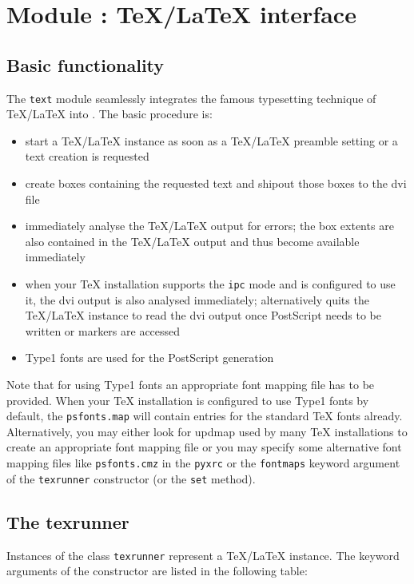 \chapter[Module \module{text}: TeX/LaTeX interface]{Module : \TeX/\LaTeX{} interface}
\label{module:text}

\section{Basic functionality}

The \verb|text| module seamlessly integrates the famous typesetting
technique of \TeX/\LaTeX{} into \PyX. The basic procedure is:
\begin{itemize}
\item start a \TeX/\LaTeX{} instance as soon as a \TeX/\LaTeX{}
preamble setting or a text creation is requested
\item create boxes containing the requested text and shipout those
boxes to the dvi file
\item immediately analyse the \TeX/\LaTeX{} output for errors; the box
extents are also contained in the \TeX/\LaTeX{} output and thus become
available immediately
\item when your TeX installation supports the \verb|ipc| mode and
\PyX{} is configured to use it, the dvi output is also analysed
immediately; alternatively \PyX{} quits the \TeX/\LaTeX{} instance to
read the dvi output once PostScript needs to be written or markers are
accessed
\item Type1 fonts are used for the PostScript generation
\end{itemize}

Note that for using Type1 fonts an appropriate font mapping file has
to be provided. When your \TeX{} installation is configured to use
Type1 fonts by default, the \verb|psfonts.map| will contain entries
for the standard \TeX{} fonts already. Alternatively, you may either
look for updmap used by many \TeX{} installations to create an
appropriate font mapping file or you may specify some alternative
font mapping files like \verb|psfonts.cmz| in the \verb|pyxrc| or the
\verb|fontmaps| keyword argument of the \verb|texrunner| constructor
(or the \verb|set| method).

\section{The texrunner}
Instances of the class \verb|texrunner| represent a \TeX/\LaTeX{}
instance. The keyword arguments of the constructor are listed in the
following table:

